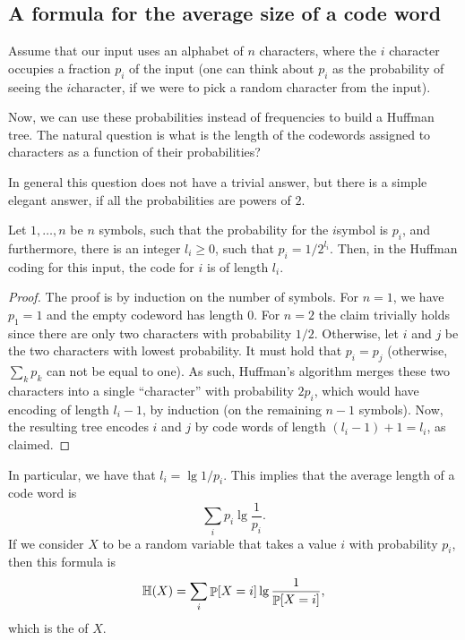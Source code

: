 \subsection{A formula for the average size of a code word}

Assume that our input uses an alphabet of $n$ characters, where the $i$\th
character occupies a fraction $p_i$ of the input (one can think about $p_i$ as
the probability of seeing the $i$\th character, if we were to pick a
random character from the input).

Now, we can use these probabilities instead of frequencies to build a
Huffman tree. The natural question is what is the length of the
codewords assigned to characters as a function of their probabilities?

In general this question does not have a trivial answer, but there is
a simple elegant answer, if all the probabilities are powers of $2$. 

\begin{lemma}
    Let $1, \ldots, n$ be $n$ symbols, such that the probability for
    the $i$\th symbol is $p_i$, and furthermore, there is an integer
    $l_i\geq 0 $, such that $p_i = 1/2^{l_i}$. Then, in the Huffman
    coding for this input, the code for $i$ is of length $l_i$.
\end{lemma}
\begin{proof}
    The proof is by induction on the number of symbols.
    For $n=1$, we have $p_1=1$ and the empty codeword has length $0$.
    For $n=2$ the claim trivially holds since there are only two
    characters with probability $1/2$. Otherwise, let $i$ and $j$ be
    the two characters with lowest probability. It must hold that $p_i
    = p_j$ (otherwise, $\sum_k p_k$ can not be equal to one). As such,
    Huffman's algorithm merges these two characters into a single ``character''
    with probability $2p_i$, which would have encoding of length
    $l_i-1$, by induction (on the remaining $n-1$ symbols). Now, the
    resulting tree encodes $i$ and $j$ by code words of length $(l_i
    -1 )+ 1 = l_i$, as claimed.
\end{proof}

In particular, we have that $l_i = \lg 1/p_i$. This implies that the
average length of a code word is 
\begin{equation*}
\sum_i p_i \lg \frac{1}{p_i}. 
\end{equation*}
If we consider $X$ to be a random variable that takes a value $i$ with
probability $p_i$, then this formula is
\begin{equation*}
\Entropy{X} = \sum_i \Prob{X = i} \lg \frac{1}{\Prob{X = i}},
\end{equation*}
which is the  of $X$.

